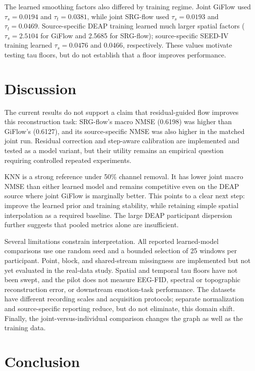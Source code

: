 \documentclass{article}
\begin{document}
The learned smoothing factors also differed by training regime. Joint
GiFlow used $\tau_s=0.0194$ and $\tau_t=0.0381$, while joint SRG-flow used
$\tau_s=0.0193$ and $\tau_t=0.0469$. Source-specific DEAP training
learned much larger spatial factors ($\tau_s=2.5104$ for GiFlow and
2.5685 for SRG-flow); source-specific SEED-IV training learned
$\tau_s=0.0476$ and 0.0466, respectively. These values motivate testing
tau floors, but do not establish that a floor improves performance.

\section{Discussion}

The current results do not support a claim that residual-guided flow
improves this reconstruction task: SRG-flow's macro NMSE (0.6198) was
higher than GiFlow's (0.6127), and its source-specific NMSE was also
higher in the matched joint run. Residual correction and step-aware
calibration are implemented and tested as a model variant, but their
utility remains an empirical question requiring controlled repeated
experiments.

KNN is a strong reference under 50\% channel removal. It has lower joint
macro NMSE than either learned model and remains competitive even on the
DEAP source where joint GiFlow is marginally better. This points to a
clear next step: improve the learned prior and training stability, while
retaining simple spatial interpolation as a required baseline. The large
DEAP participant dispersion further suggests that pooled metrics alone
are insufficient.

Several limitations constrain interpretation. All reported learned-model
comparisons use one random seed and a bounded selection of 25 windows per
participant. Point, block, and shared-stream missingness are implemented
but not yet evaluated in the real-data study. Spatial and temporal tau
floors have not been swept, and the pilot does not measure EEG-FID,
spectral or topographic reconstruction error, or downstream emotion-task
performance. The datasets have different recording scales and
acquisition protocols; separate normalization and source-specific
reporting reduce, but do not eliminate, this domain shift. Finally, the
joint-versus-individual comparison changes the graph as well as the
training data.

\section{Conclusion}
\end{document}
